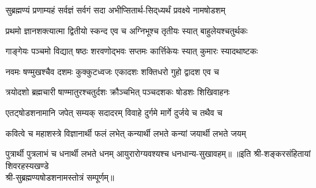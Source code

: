
\twolineshloka
{सुब्रह्मण्यं प्रणाम्यहं सर्वज्ञं सर्वगं सदा}
{अभीप्सितार्थ-सिद्‌ध्यर्थं प्रवक्ष्ये नामषोडशम्}

\twolineshloka
{प्रथमो ज्ञानशक्त्यात्मा द्वितीयो स्कन्द एव च}
{अग्निभूश्च तृतीयः स्यात् बाहुलेयश्चतुर्थकः}

\twolineshloka
{गाङ्गेयः पञ्चमो विद्यात् षष्ठः शरवणोद्भवः}
{सप्तमः कार्त्तिकेयः स्यात् कुमारः स्यादथाष्टकः}

\twolineshloka
{नवमः षण्मुखश्चैव दशमः कुक्कुटध्वजः}
{एकादशः शक्तिधरो गुहो द्वादश एव च}

\twolineshloka
{त्रयोदशो ब्रह्मचारी षाण्मातुरश्चतुर्दशः}
{क्रौञ्चभित् पञ्चदशकः षोडशः शिखिवाहनः}

\twolineshloka
{एतट्षोडशनामानि जपेत् सम्यक् सदादरम्}
{विवाहे दुर्गमे मार्गे दुर्जये च तथैव च}

\twolineshloka
{कवित्वे च महाशस्त्रे विज्ञानार्थी फलं लभेत्}
{कन्यार्थी लभते कन्यां जयार्थी लभते जयम्}

\twolineshloka
{पुत्रार्थी पुत्रलाभं  च धनार्थी लभते धनम्}
{आयुरारोग्यवश्यश्च धनधान्य-सुखावहम्॥}
॥इति श्री-शङ्करसंहितायां शिवरहस्यखण्डे\\
श्री-सुब्रह्मण्यषोडशनामस्तोत्रं सम्पूर्णम्॥